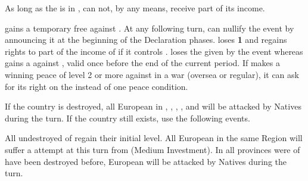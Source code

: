 
\phevnt
\aparag As long as the  is in \paysEgypte, \TUR can not, by
any means, receive part of its income.

\phdipl
\aparag \TUR gains a temporary free \OCB against \VEN.
\aparag At any following turn, \VEN can nullify the event by announcing it at
the beginning of the Declaration phases.  \VEN loses {\bf 1 } \STAB and \TUR
regains rights to part of the income of  if it controls
\paysdamas. \TUR loses the \CB given by the event whereas \VEN gains a \CB
against \TUR, valid once before the end of the current period.
\aparag If \TUR makes a winning peace of level 2 or more against \VEN in a war
(oversea or regular), it can ask for its right on the 
instead of one peace condition.





\condition{}
\aparag If the country \paysGujerat is destroyed, all European \TP in
\granderegionGujarat, \granderegionMalacca, \granderegionSumatra,
\granderegionJava, and  will be attacked by
Natives during the turn.
\aparag If the country \paysGujerat still exists, use the following events.

\phevnt
\aparag All undestroyed \TP of \paysGujerat regain their initial level.  All
European \TP in the same Region will suffer a \CONC attempt at this turn from
\paysGujerat (Medium Investment).
\aparag In all provinces were \TP of \paysGujerat have been destroyed before,
European \TP will be attacked by Natives during the turn.





